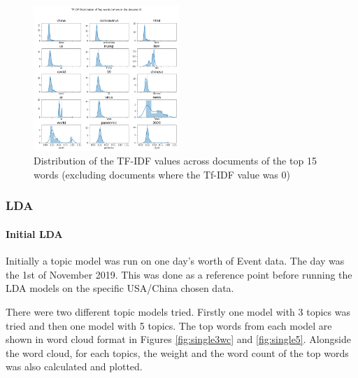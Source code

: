 \begin{figure}[H]
	\centering
	\includegraphics[width=0.49\textwidth]{Images/usa_tfidf_top_distribution.png}
	\caption{Distribution of the TF-IDF values across documents of the top 15 words (excluding documents where the Tf-IDF value was 0)}
	\label{fig:tfidfdist}
\end{figure}

\subsubsection{LDA}
\paragraph{Initial LDA}
Initially a topic model was run on one day's worth of Event data. The day was the 1st of November 2019. This was done as a reference point before running the LDA models on the specific USA/China chosen data.

There were two different topic models tried. Firstly one model with 3 topics was tried and then one model with 5 topics. The top words from each model are shown in word cloud format in Figures \ref{fig:single3wc} and \ref{fig:single5}. Alongside the word cloud, for each topics, the weight and the word count of the top words was also calculated and plotted. 
	
